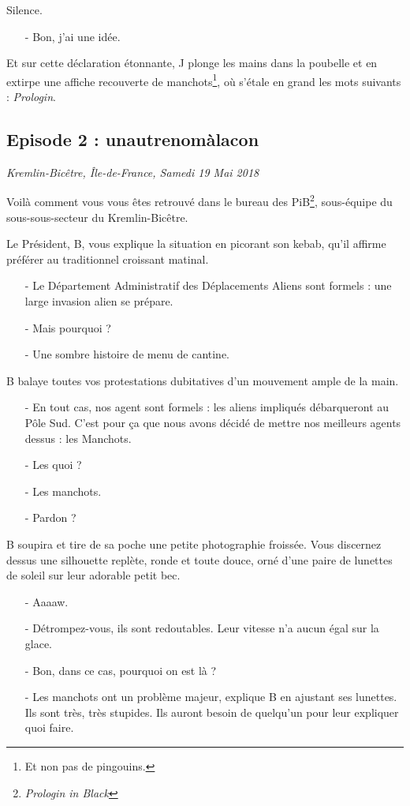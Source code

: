 Silence.

\begin{itemize}
\item[-] Bon, j'ai une idée.
\end{itemize}

Et sur cette déclaration étonnante, J plonge les mains dans la poubelle et en
extirpe une affiche recouverte de manchots\footnote{Et non pas de pingouins.},
où s'étale en grand les mots suivants : \emph{Prologin}.

\subsection{Episode 2 : unautrenomàlacon}
\hfill \textit{Kremlin-Bicêtre, Île-de-France, Samedi 19 Mai 2018}

Voilà comment vous vous êtes retrouvé dans le bureau des
PiB\footnote{\emph{Prologin in Black}\texttrademark}, sous-équipe du
sous-sous-secteur du Kremlin-Bicêtre.

Le Président, B, vous explique la situation en picorant son kebab, qu'il
affirme préférer au traditionnel croissant matinal.

\begin{itemize}
    \item[-] Le Département Administratif des Déplacements Aliens sont formels
        : une large invasion alien se prépare.
    \item[-] Mais pourquoi ?
    \item[-] Une sombre histoire de menu de cantine. %
\end{itemize}
B balaye toutes vos protestations dubitatives d'un mouvement ample de la main.
\begin{itemize}
    \item[-] En tout cas, nos agent sont formels : les aliens impliqués
        débarqueront au Pôle Sud. C'est pour ça que nous avons décidé de mettre
        nos meilleurs agents dessus : les Manchots.
    \item[-] Les quoi ?
    \item[-] Les manchots.
    \item[-] Pardon ?
\end{itemize}

B soupira et tire de sa poche une petite photographie froissée. Vous discernez
dessus une silhouette replète, ronde et toute douce, orné d'une paire de
lunettes de soleil sur leur adorable petit bec.

\begin{itemize}
    \item[-] Aaaaw.
    \item[-] Détrompez-vous, ils sont redoutables. Leur vitesse n'a aucun égal
        sur la glace.
    \item[-] Bon, dans ce cas, pourquoi on est là ?
    \item[-] Les manchots ont un problème majeur, explique B en ajustant ses
        lunettes. Ils sont très, très stupides. Ils auront besoin de quelqu'un
        pour leur expliquer quoi faire.
\end{itemize}

